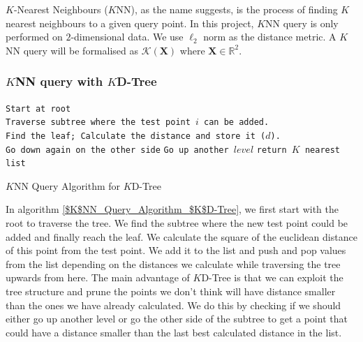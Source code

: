 $K$-Nearest Neighbours ($K$NN), as the name suggests, is the process of finding $K$ nearest neighbours to a given query point. In this project, $K$NN query is only performed on $2$-dimensional data. We use $\ell_2$ norm as the distance metric. A $K$NN query will be formalised as $\mathcal{K}(\boldsymbol{X})$ where $\boldsymbol{X}\in\mathbb{R}^2$.

\subsubsection{$K$NN query with $K$D-Tree}

\begin{algorithm}[H]
    \SetAlgoLined
    {
        \texttt{Start at root}\\
        \texttt{Traverse subtree where the test point $i$ can be added.}\\
        \texttt{Find the leaf; Calculate the distance and store it ($d$).}\\
            {
                    {
                        \texttt{Go down again on the other side} 
                    }
                        {
                            \texttt{Go up another $level$}
                        }
            }
            {
                \texttt{return $K$ nearest list}
            }
        
    }
    \caption{$K$NN Query Algorithm for $K$D-Tree}
    \label{$K$NN_Query_Algorithm_$K$D-Tree}
\end{algorithm}

In algorithm \ref{$K$NN_Query_Algorithm_$K$D-Tree}, we first start with the root to traverse the tree. We find the subtree where the new test point could be added and finally reach the leaf. We calculate the square of the euclidean distance of this point from the test point. We add it to the list and push and pop values from the list depending on the distances we calculate while traversing the tree upwards from here. The main advantage of $K$D-Tree is that we can exploit the tree structure and prune the points we don't think will have distance smaller than the ones we have already calculated. We do this by checking if we should either go up another level or go the other side of the subtree to get a point that could have a distance smaller than the last best calculated distance in the list. 

